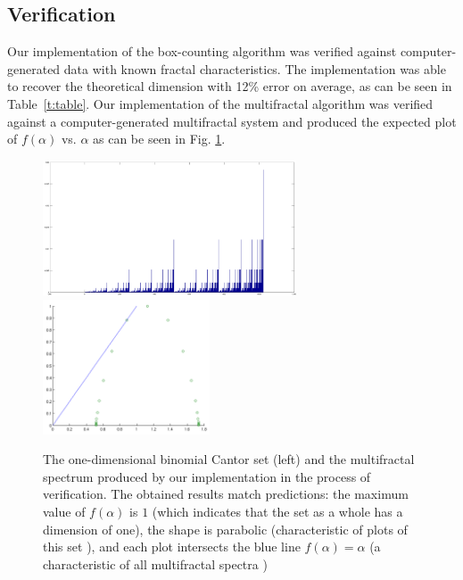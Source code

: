 \documentclass[iop]{emulateapj}
\begin{document}
\subsection{Verification}\label{Verification}

Our implementation of the box-counting algorithm was verified against computer-generated data with known fractal characteristics. The implementation was able to recover the theoretical dimension with 12\% error on average, as can be seen in Table~\ref{t:table}. Our implementation of the multifractal algorithm was verified against a computer-generated multifractal system and produced the expected plot of $f(\alpha)$ vs. $\alpha$ as can be seen in Fig. \ref{f:cantorset}. 

\begin{figure}[ht]
	\begin{center}
	\includegraphics[height=4cm,clip=true]{Graphics/binomialcantor1024.png}%
	\includegraphics[height=4cm,clip=true]{Graphics/firstf(a)plot!.png}%
	\end{center}
	\caption{The one-dimensional binomial Cantor set (left) and the multifractal spectrum produced by our implementation in the process of verification. The obtained results match predictions: the maximum value of $f(\alpha)$ is $1$ (which indicates that the set as a whole has a dimension of one), the shape is parabolic (characteristic of plots of this set \citep{Chhabra1989}), and each plot intersects the blue line $f(\alpha) = \alpha$ (a characteristic of all multifractal spectra \citep{mandelbrotmultifractal})}
	\label{f:cantorset}
	\end{figure}
\end{document}

